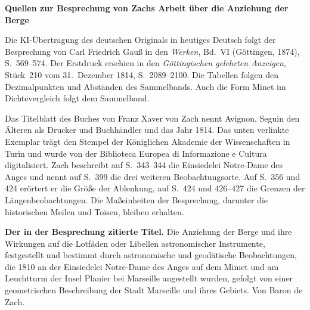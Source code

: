\clearpage\thispagestyle{empty}
\begin{center}\Large\bfseries Quellen zur Besprechung von Zachs Arbeit über die Anziehung der Berge\end{center}

Die KI-Übertragung des deutschen Originals in heutiges Deutsch folgt der Besprechung von Carl Friedrich Gauß in den \emph{Werken}, Bd.~VI (Göttingen, 1874), S.~569--574. Der Erstdruck erschien in den \emph{Göttingischen gelehrten Anzeigen}, Stück~210 vom 31.~Dezember 1814, S.~2089--2100. Die Tabellen folgen den Dezimalpunkten und Abständen des Sammelbands. Auch die Form Minet im Dichtevergleich folgt dem Sammelband.

Das Titelblatt des Buches von Franz Xaver von Zach nennt Avignon, Seguin den Älteren als Drucker und Buchhändler und das Jahr 1814. Das unten verlinkte Exemplar trägt den Stempel der Königlichen Akademie der Wissenschaften in Turin und wurde von der Biblioteca Europea di Informazione e Cultura digitalisiert. Zach beschreibt auf S.~343--344 die Einsiedelei Notre-Dame des Anges und nennt auf S.~399 die drei weiteren Beobachtungsorte. Auf S.~356 und 424 erörtert er die Größe der Ablenkung, auf S.~424 und 426--427 die Grenzen der Längenbeobachtungen. Die Maßeinheiten der Besprechung, darunter die historischen Meilen und Toisen, bleiben erhalten.

\noindent\textbf{Der in der Besprechung zitierte Titel.} Die Anziehung der Berge und ihre Wirkungen auf die Lotfäden oder Libellen astronomischer Instrumente, festgestellt und bestimmt durch astronomische und geodätische Beobachtungen, die 1810 an der Einsiedelei Notre-Dame des Anges auf dem Mimet und am Leuchtturm der Insel Planier bei Marseille angestellt wurden, gefolgt von einer geometrischen Beschreibung der Stadt Marseille und ihres Gebiets. Von Baron de Zach.


